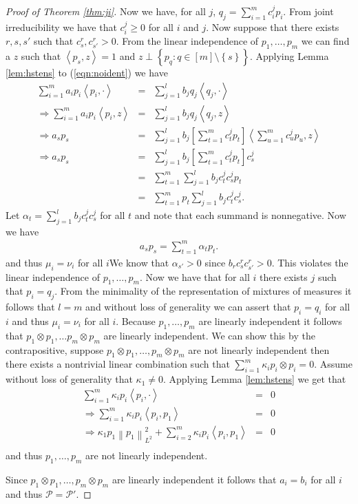 \documentclass[aos,preprint]{imsart}
\def\l{\left}
\def\r{\right}
\def\sP{\mathscr{P}}
\theoremstyle{plain}
\theoremstyle{defintion}
\begin{document}
\begin{proof}[Proof of Theorem \ref{thm:ji}]
		Now we have, for all $j$, $q_j = \sum_{i=1}^m c_i^j p_i$. From joint irreducibility we have that $c_i^j \ge 0$ for all $i$ and $j$. Now suppose that there exists $r,s,s'$ such that $c_s^r,c_{s'}^r >0$. From the linear independence of $p_1,\ldots,p_m$ we can find a $z$ such that $\l<p_s,z\r> = 1$ and $z\perp \left\{ p_q:q\in \left[ m \right]\setminus \left\{ s \right\} \right\}$. Applying Lemma \ref{lem:hstens} to (\ref{eqn:noident}) we have
		\begin{eqnarray*}
			\sum_{i=1}^m  a_i p_i \l< p_i, \cdot \r> &=& \sum_{j=1}^l  b_j q_j \l<q_j,\cdot\r>\\
			\Rightarrow \sum_{i=1}^m  a_i p_i \l< p_i, z \r> &=& \sum_{j=1}^l  b_j q_j \l<q_j,z\r>\\
			\Rightarrow  a_s p_s  &=& \sum_{j=1}^l  b_j \l[\sum_{t=1}^m c_t^j p_t\r] \l<\sum_{u=1}^m c_u^j p_u,z\r>\\
			\Rightarrow  a_s p_s  &=& \sum_{j=1}^l  b_j \l[\sum_{t=1}^m c_t^j p_t\r] c_s^j\\
                        &=&    \sum_{t=1}^m \sum_{j=1}^l b_jc_t^j c_s^j p_t \\
                        &=&    \sum_{t=1}^m p_t \sum_{j=1}^l b_jc_t^j c_s^j. 
		\end{eqnarray*}
		Let $\alpha_t = \sum_{j=1}^l b_jc_t^j c_s^j$ for all $t$ and note that each summand is nonnegative. Now we have
		\begin{eqnarray*}
			a_s p_s = \sum_{t=1}^m \alpha_t p_t.
		\end{eqnarray*}
		 and thus $\mu_i = \nu_i$ for all $i$We know that $\alpha_{s'}>0$ since $b_r c_s^r c_{s'}^r >0$. This violates the linear independence of $p_1,\ldots,p_m$. Now we have that for all $i$ there exists $j$ such that $p_i = q_j$. From the minimality of the representation of mixtures of measures it follows that $l=m$ and without loss of generality we can assert that $p_i = q_i$ for all $i$ and thus $\mu_i = \nu_i$ for all $i$. Because $p_1, \ldots, p_m$ are linearly independent it follows that $p_1\otimes p_1,\ldots p_m\otimes p_m$ are linearly independent. We can show this by the contrapositive, suppose $p_1\otimes p_1, \ldots , p_m\otimes p_m$ are not linearly independent then there exists a nontrivial linear combination such that  $\sum_{i=1}^m \kappa_i p_i\otimes p_i = 0$. Assume without loss of generality that $\kappa_1 \neq 0$. Applying Lemma \ref{lem:hstens} we get that
		\begin{eqnarray*}
			\sum_{i=1}^m \kappa_i p_i \l<p_i,\cdot\r> &=&  0\\
			\Rightarrow \sum_{i=1}^m \kappa_i p_i \l<p_i,p_1\r> &=&  0\\
			\Rightarrow \kappa_1 p_1 \l\|p_1\r\|_{L^2}^2 + \sum_{i=2}^m \kappa_i p_i \l<p_i,p_1\r> &=&  0\\
		\end{eqnarray*}
		and thus $p_1,\ldots,p_m$ are not linearly independent.

		Since $p_1\otimes p_1,\ldots,p_m\otimes p_m$ are linearly independent it follows that $a_i = b_i$ for all $i$ and thus $\sP = \sP'$.

	\end{proof}
\end{document}
